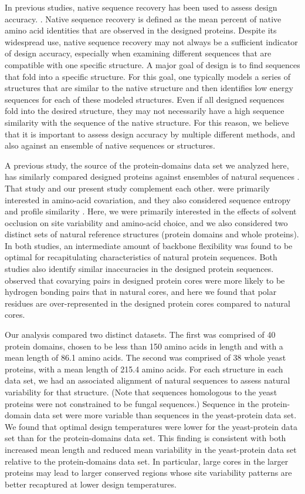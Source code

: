 \documentclass[12pt]{article}
\begin{document}
In previous studies, native sequence recovery has been used to assess design accuracy. \citep{Ganinza2012, Kuhlman2000}. Native sequence recovery is defined as the mean percent of native amino acid identities that are observed in the designed proteins. Despite its widespread use, native sequence recovery may not always be a sufficient indicator of design accuracy, especially when examining different sequences that are compatible with one specific structure. A major goal of design is to find sequences that fold into a specific structure. For this goal, one typically models a series of structures that are similar to the native structure and then identifies low energy sequences for each of these modeled structures. Even if all designed sequences fold into the desired structure, they may not necessarily have a high sequence similarity with the sequence of the native structure. For this reason, we believe that it is important to assess design accuracy by multiple different methods, and also against an ensemble of native sequences or structures.

A previous study, the source of the protein-domains data set we analyzed here, has similarly compared designed proteins against ensembles of natural sequences \citep{OllikainenKortemme}. That study and our present study complement each other. \citet{OllikainenKortemme} were primarily interested in amino-acid covariation, and they also considered sequence entropy and profile similarity \citep{Yona2002}. Here, we were primarily interested in the effects of solvent occlusion on site variability and amino-acid choice, and we also considered two distinct sets of natural reference structures (protein domains and whole proteins). In both studies, an intermediate amount of backbone flexibility was found to be optimal for recapitulating characteristics of natural protein sequences.  Both studies also identify similar inaccuracies in the designed protein sequences.  \citet{OllikainenKortemme} observed that covarying pairs in designed protein cores were more likely to be hydrogen bonding pairs that in natural cores, and here we found that polar residues are over-represented in the designed protein cores compared to natural cores.

Our analysis compared two distinct datasets. The first was comprised of 40 protein domains, chosen to be less than 150 amino acids in length and with a mean length of 86.1 amino acids. The second was comprised of 38 whole yeast proteins, with a mean length of 215.4 amino acids. For each structure in each data set, we had an associated alignment of natural sequences to assess natural variability for that structure. (Note that sequences homologous to the yeast proteins were not constrained to be fungal sequences.) Sequence in the protein-domain data set were more variable than sequences in the yeast-protein data set. We found that optimal design temperatures were lower for the yeast-protein data set than for the protein-domains data set. This finding is consistent with both increased mean length and reduced mean variability in the yeast-protein data set relative to the protein-domains data set. In particular, large cores in the larger proteins may lead to larger conserved regions whose site variability patterns are better recaptured at lower design temperatures. 
\end{document}
